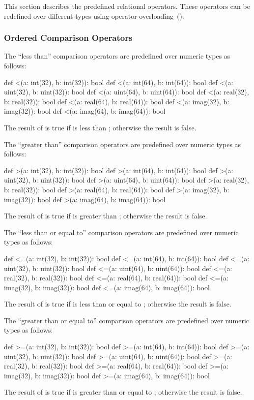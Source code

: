This section describes the predefined relational operators.  These
operators can be redefined over different types using operator
overloading~().

\subsubsection{Ordered Comparison Operators}
\label{Ordered_Comparison_Operators}

The ``less than'' comparison operators are predefined over numeric
types as follows:
\begin{chapel}
def <(a: int(32), b: int(32)): bool
def <(a: int(64), b: int(64)): bool
def <(a: uint(32), b: uint(32)): bool
def <(a: uint(64), b: uint(64)): bool
def <(a: real(32), b: real(32)): bool
def <(a: real(64), b: real(64)): bool
def <(a: imag(32), b: imag(32)): bool
def <(a: imag(64), b: imag(64)): bool
\end{chapel}
The result of  is true if  is less than ;
otherwise the result is false.

The ``greater than'' comparison operators are predefined over numeric
types as follows:
\begin{chapel}
def >(a: int(32), b: int(32)): bool
def >(a: int(64), b: int(64)): bool
def >(a: uint(32), b: uint(32)): bool
def >(a: uint(64), b: uint(64)): bool
def >(a: real(32), b: real(32)): bool
def >(a: real(64), b: real(64)): bool
def >(a: imag(32), b: imag(32)): bool
def >(a: imag(64), b: imag(64)): bool
\end{chapel}
The result of  is true if  is greater
than ; otherwise the result is false.

The ``less than or equal to'' comparison operators are predefined over
numeric types as follows:
\begin{chapel}
def <=(a: int(32), b: int(32)): bool
def <=(a: int(64), b: int(64)): bool
def <=(a: uint(32), b: uint(32)): bool
def <=(a: uint(64), b: uint(64)): bool
def <=(a: real(32), b: real(32)): bool
def <=(a: real(64), b: real(64)): bool
def <=(a: imag(32), b: imag(32)): bool
def <=(a: imag(64), b: imag(64)): bool
\end{chapel}
The result of  is true if  is less than or equal
to ; otherwise the result is false.

The ``greater than or equal to'' comparison operators are predefined
over numeric types as follows:
\begin{chapel}
def >=(a: int(32), b: int(32)): bool
def >=(a: int(64), b: int(64)): bool
def >=(a: uint(32), b: uint(32)): bool
def >=(a: uint(64), b: uint(64)): bool
def >=(a: real(32), b: real(32)): bool
def >=(a: real(64), b: real(64)): bool
def >=(a: imag(32), b: imag(32)): bool
def >=(a: imag(64), b: imag(64)): bool
\end{chapel}
The result of  is true if  is greater than or
equal to ; otherwise the result is false.

